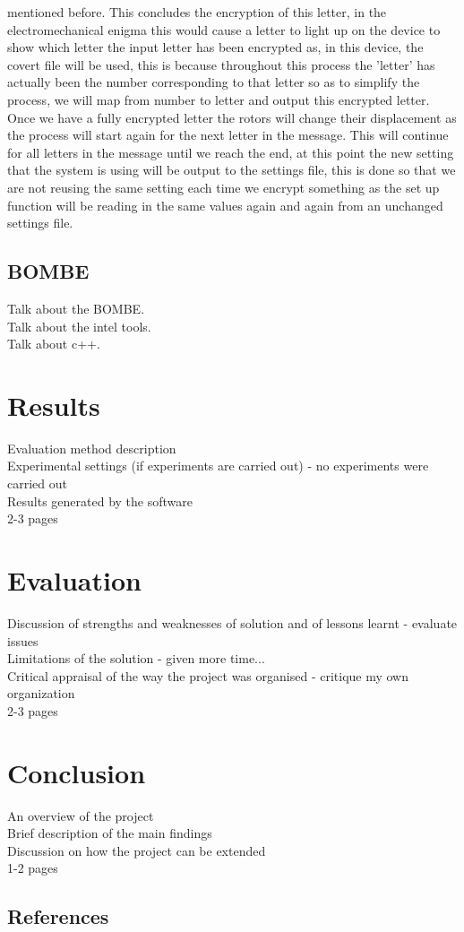 \documentclass[12pt,a4paper]{article}
\begin{document}
mentioned before. This concludes the encryption of this letter, in the electromechanical enigma this would cause a letter to light up on the device to show which letter the input letter has been encrypted as, in this device, the covert file will be used, this is because throughout this process the 'letter' has actually been the number corresponding to that letter so as to simplify the process, we will map from number to letter and output this encrypted letter. Once we have a fully encrypted letter the rotors will change their displacement as the process will start again for the next letter in the message. This will continue for all letters in the message until we reach the end, at this point the new setting that the system is using will be output to the settings file, this is done so that we are not reusing the same setting each time we encrypt something as the set up function will be reading in the same values again and again from an unchanged settings file.

\subsection{BOMBE}

Talk about the BOMBE.\\
Talk about the intel tools.\\
Talk about c++.\\

\section{Results}

Evaluation method description\\
Experimental settings (if experiments are carried out) - no experiments were carried out\\
Results generated by the software\\
2-3 pages

\section{Evaluation}

Discussion of strengths and weaknesses of solution and of lessons learnt - evaluate issues\\
Limitations of the solution - given more time...\\
Critical appraisal of the way the project was organised - critique my own organization\\
2-3 pages

\section{Conclusion}

An overview of the project\\
Brief description of the main findings\\
Discussion on how the project can be extended\\
1-2 pages

\subsection{References} 



\nocite{*}
\end{document}
